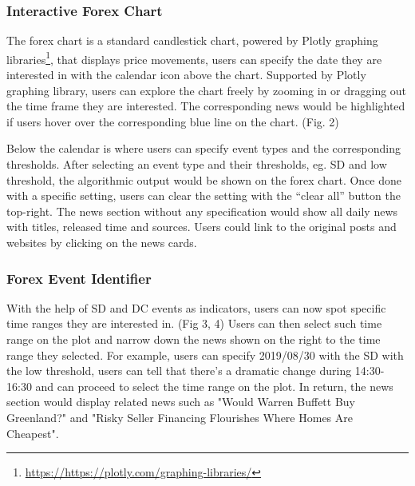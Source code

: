 \documentclass[sigconf]{acmart}
\begin{document}
\subsubsection{Interactive Forex Chart}
The forex chart is a standard candlestick chart, powered by Plotly graphing libraries\footnote{\url{https://https://plotly.com/graphing-libraries/}}, that displays price movements, users can specify the date they are interested in with the calendar icon above the chart. Supported by Plotly graphing library, users can explore the chart freely by zooming in or dragging out the time frame they are interested. The corresponding news would be highlighted if users hover over the corresponding blue line on the chart. (Fig. 2)


Below the calendar is where users can specify event types and the corresponding thresholds. After selecting an event type and their thresholds, eg. SD and low threshold,  the algorithmic output would be shown on the forex chart. Once done with a specific setting, users can clear the setting with the “clear all” button the top-right. The news section without any specification would show all daily news with titles, released time and sources. Users could link to the original posts and websites by clicking on the news cards. 



\subsubsection{Forex Event Identifier}
With the help of SD and DC events as indicators, users can now spot specific time ranges they are interested in. (Fig 3, 4) Users can then select such time range on the plot and narrow down the news shown on the right to the time range they selected. For example, users can specify 2019/08/30 with the SD with the low threshold, users can tell that there’s a dramatic change during 14:30-16:30 and can proceed to select the time range on the plot. In return, the news section would display related news such as "Would Warren Buffett Buy Greenland?" and "Risky Seller Financing Flourishes Where Homes Are Cheapest". 
\end{document}
